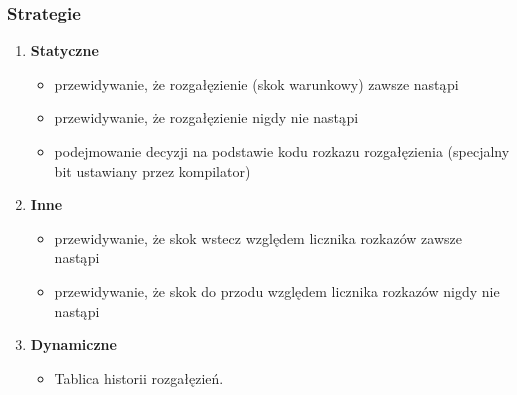 \documentclass[a4paper,twoside]{article}
\begin{document}
\subsubsection{Strategie}
\begin{enumerate}
	\item \textbf{Statyczne}
	\begin{itemize}
		\item przewidywanie, że rozgałęzienie (skok warunkowy) zawsze nastąpi
		\item przewidywanie, że rozgałęzienie nigdy nie nastąpi
		\item podejmowanie decyzji na podstawie kodu rozkazu rozgałęzienia (specjalny bit ustawiany przez kompilator)
	\end{itemize}
	\item \textbf{Inne}
	\begin{itemize}
		\item przewidywanie, że skok wstecz względem licznika rozkazów zawsze nastąpi
		\item przewidywanie, że skok do przodu względem licznika rozkazów nigdy nie nastąpi
	\end{itemize}
	\item \textbf{Dynamiczne}
	\begin{itemize}
		\item Tablica historii rozgałęzień.
	\end{itemize}
\end{enumerate}
\end{document}
